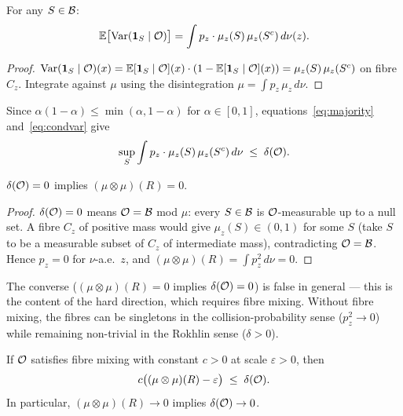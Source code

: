 \begin{lemma}
\label{lem:condvar}
For any $S \in \mathcal{B}$:
\begin{equation}\label{eq:condvar}
  \mathbb{E}\bigl[\operatorname{Var}(\mathbf{1}_S \mid \mathcal{O})\bigr]
  = \int p_z \cdot \mu_z(S)\,\mu_z(S^c)\,d\nu(z).
\end{equation}
\end{lemma}

\begin{proof}
$\operatorname{Var}(\mathbf{1}_S \mid \mathcal{O})(x) =
\mathbb{E}[\mathbf{1}_S \mid \mathcal{O}](x) \cdot
(1 - \mathbb{E}[\mathbf{1}_S \mid \mathcal{O}](x))
= \mu_z(S)\,\mu_z(S^c)$ on fibre $C_z$.  Integrate against $\mu$
using the disintegration $\mu = \int p_z\,\mu_z\,d\nu$.
\end{proof}

\noindent Since $\alpha(1-\alpha) \leq \min(\alpha, 1-\alpha)$
for $\alpha \in [0,1]$, equations~\eqref{eq:majority}
and~\eqref{eq:condvar} give
\begin{equation}\label{eq:variance-vs-rokhlin}
  \sup_S \int p_z \cdot \mu_z(S)\,\mu_z(S^c)\,d\nu
  \;\leq\; \delta(\mathcal{O}).
\end{equation}

\begin{theorem}
\label{thm:easy}
$\delta(\mathcal{O}) = 0$ implies $(\mu \otimes \mu)(R) = 0$.
\end{theorem}

\begin{proof}
$\delta(\mathcal{O}) = 0$ means $\mathcal{O} = \mathcal{B}$ mod $\mu$: every
$S \in \mathcal{B}$ is $\mathcal{O}$-measurable up to a null set.  A fibre
$C_z$ of positive mass would give $\mu_z(S) \in (0,1)$ for some
$S$ (take $S$ to be a measurable subset of $C_z$ of intermediate
mass), contradicting $\mathcal{O} = \mathcal{B}$.  Hence $p_z = 0$ for
$\nu$-a.e.\ $z$, and $(\mu \otimes \mu)(R) = \int p_z^2\,d\nu = 0$.
\end{proof}

\begin{remark}
The converse ($(\mu \otimes \mu)(R) = 0$ implies $\delta(\mathcal{O}) = 0$)
is false in general --- this is the content of the hard direction,
which requires fibre mixing.  Without fibre mixing, the fibres can
be singletons in the collision-probability sense ($p_z^2 \to 0$)
while remaining non-trivial in the Rokhlin sense ($\delta > 0$).
\end{remark}

\begin{theorem}
\label{thm:hard}
If $\mathcal{O}$ satisfies fibre mixing with constant $c > 0$ at scale
$\varepsilon > 0$, then
\begin{equation}\label{eq:hard-bound}
  c\bigl((\mu \otimes \mu)(R) - \varepsilon\bigr)
  \;\leq\;
  \delta(\mathcal{O}).
\end{equation}
In particular, $(\mu \otimes \mu)(R) \to 0$ implies
$\delta(\mathcal{O}) \to 0$.
\end{theorem}

